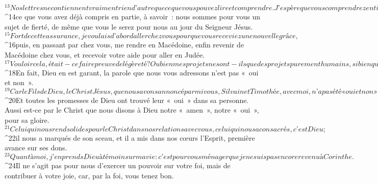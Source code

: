 ${}^{13}Nos lettres ne contiennent vraiment rien d’autre que ce que vous pouvez lire et comprendre. J’espère que vous comprendrez entièrement 
${}^{14}ce que vous avez déjà compris en partie, à savoir : nous sommes pour vous un sujet de fierté, de même que vous le serez pour nous au jour du Seigneur Jésus.
${}^{15}Fort de cette assurance, je voulais d’abord aller chez vous pour que vous receviez une nouvelle grâce, 
${}^{16}puis, en passant par chez vous, me rendre en Macédoine, enfin revenir de Macédoine chez vous, et recevoir votre aide pour aller en Judée. 
${}^{17}Vouloir cela, était-ce faire preuve de légèreté ? Ou bien mes projets ne sont-ils que des projets purement humains, si bien qu’il y aurait chez moi en même temps le « oui » et le « non » ? 
${}^{18}En fait, Dieu en est garant, la parole que nous vous adressons n’est pas « oui et non ». 
${}^{19}Car le Fils de Dieu, le Christ Jésus, que nous avons annoncé parmi vous, Silvain et Timothée, avec moi, n’a pas été « oui et non » ; il n’a été que « oui ». 
${}^{20}Et toutes les promesses de Dieu ont trouvé leur « oui » dans sa personne. Aussi est-ce par le Christ que nous disons à Dieu notre « amen », notre « oui », pour sa gloire. 
${}^{21}Celui qui nous rend solides pour le Christ dans nos relations avec vous, celui qui nous a consacrés, c’est Dieu ; 
${}^{22}il nous a marqués de son sceau, et il a mis dans nos cœurs l’Esprit, première avance sur ses dons.
${}^{23}Quant à moi, j’en prends Dieu à témoin sur ma vie : c’est pour vous ménager que je ne suis pas encore revenu à Corinthe. 
${}^{24}Il ne s’agit pas pour nous d’exercer un pouvoir sur votre foi, mais de contribuer à votre joie, car, par la foi, vous tenez bon.
      
